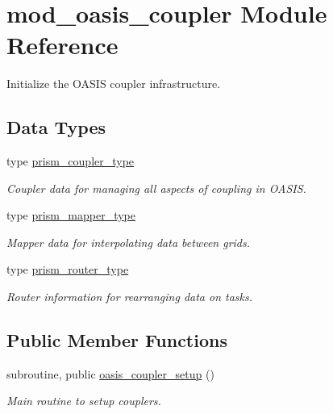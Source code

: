 \hypertarget{classmod__oasis__coupler}{\section{mod\+\_\+oasis\+\_\+coupler Module Reference}
\label{classmod__oasis__coupler}
}


Initialize the O\+A\+S\+I\+S coupler infrastructure.  


\subsection*{Data Types}
\begin{DoxyCompactItemize}
\item 
type \hyperlink{structmod__oasis__coupler_1_1prism__coupler__type}{prism\+\_\+coupler\+\_\+type}
\begin{DoxyCompactList}\small\item\em Coupler data for managing all aspects of coupling in O\+A\+S\+I\+S. \end{DoxyCompactList}\item 
type \hyperlink{structmod__oasis__coupler_1_1prism__mapper__type}{prism\+\_\+mapper\+\_\+type}
\begin{DoxyCompactList}\small\item\em Mapper data for interpolating data between grids. \end{DoxyCompactList}\item 
type \hyperlink{structmod__oasis__coupler_1_1prism__router__type}{prism\+\_\+router\+\_\+type}
\begin{DoxyCompactList}\small\item\em Router information for rearranging data on tasks. \end{DoxyCompactList}\end{DoxyCompactItemize}
\subsection*{Public Member Functions}
\begin{DoxyCompactItemize}
\item 
subroutine, public \hyperlink{classmod__oasis__coupler_ab48c4d4ee118f948ccc286eec5b509ec}{oasis\+\_\+coupler\+\_\+setup} ()
\begin{DoxyCompactList}\small\item\em Main routine to setup couplers. \end{DoxyCompactList}\end{DoxyCompactItemize}
